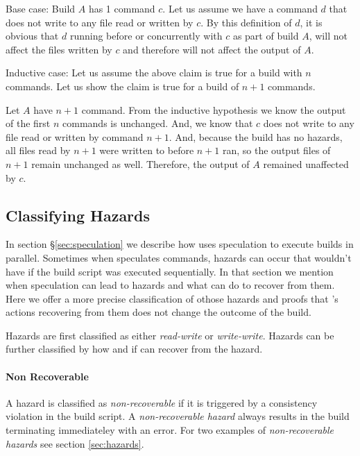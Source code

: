 Base case:  Build $A$ has 1 command $c$.  Let us assume we have a command $d$ that does not write to any file read or written by $c$.  By this definition of $d$, it is obvious that $d$ running before or
concurrently with $c$ as part of build $A$, will not affect the files written by $c$ and therefore will not affect the output of $A$.

Inductive case: Let us assume the above claim is true for a build with $n$ commands.  Let us show the claim is true for a build of $n+1$ commands.

Let $A$ have $n+1$ command.  From the inductive hypothesis we know the output of the first $n$ commands is unchanged.  And, we know that $c$ does not write to any file read or written by command $n+1$.  And, because the build has no hazards, all files read by $n+1$ were written to before $n+1$ ran, so the output files of $n+1$ remain unchanged as well.  Therefore, the output of $A$ remained unaffected by $c$.

\subsection{Classifying Hazards}
\label{sec:proof:classify_hazard}


In section \S\ref{sec:speculation} we describe how \Rattle uses speculation to execute builds in parallel.  Sometimes when \Rattle speculates commands, hazards can occur that wouldn't have if the build script was executed sequentially.  In that section we mention when speculation can lead to hazards and what \Rattle can do to recover from them.  Here we offer a more precise classification of othose hazards and proofs that \Rattle's actions recovering from them does not change the outcome of the build.

Hazards are first classified as either \emph{read-write} or \emph{write-write}.  Hazards can be further classified by how and if \Rattle can recover from the hazard.

\paragraph{Non Recoverable}
A hazard is classified as \emph{non-recoverable} if it is triggered by a consistency violation in the build script.  A \emph{non-recoverable hazard} always results in the build terminating immediateley with an error.  For two examples of \emph{non-recoverable hazards} see section \ref{sec:hazards}.

